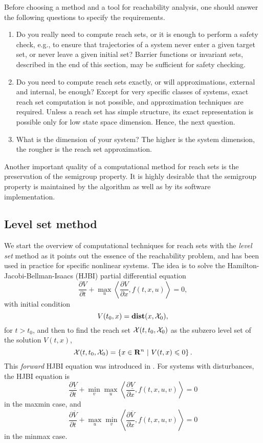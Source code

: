 Before choosing a method and a tool for reachability analysis, one should answer the following questions to specify the requirements.
\begin{enumerate}
\item Do you really need to compute reach sets, or it is enough to perform
a safety check, e.g., to ensure that trajectories of a system
never enter a given target set, or never leave a given initial set?
Barrier functions or invariant sets, described in the end of this
section, may be sufficient for safety checking.

\item Do you need to compute reach sets exactly, or will approximations, external
and internal, be enough?
Except for very specific classes of systems, exact reach set computation
is not possible, and approximation techniques are required.
Unless a reach set has simple structure, its exact representation is
possible only for low state space dimension.
Hence, the next question.

\item What is the dimension of your system?
The higher is the system dimension, the rougher is the reach set approximation.
\end{enumerate}
Another important quality of a computational method for reach sets is
the preservation of the semigroup property.
It is highly desirable that the semigroup property is maintained by the
algorithm as well as by its software implementation.











\subsection{Level set method}\label{subsec_levelset}
We start the overview of computational techniques for reach sets with the
\emph{level set} method as it points out the essence of the
reachability problem, and 
has been used in practice for specific nonlinear systems.
The idea is to solve the Hamilton-Jacobi-Bellman-Isaacs (HJBI) partial
differential equation
\[ \frac{\partial V}{\partial t} +
\max_u\left\langle\frac{\partial V}{\partial x}, f(t, x, u)\right\rangle = 0,\]
with initial condition
\[ V(t_0, x) = {\bf dist}(x, \XX_0), \]
for $t>t_0$, and then to find the reach set $\XX(t, t_0, \XX_0)$ as the subzero level
set of the solution $V(t, x)$,
\[ \XX(t, t_0, \XX_0) = \left\{x\in{\bf R}^n ~|~ V(t, x) \leq 0\right\} .\]
This \emph{forward} HJBI equation was introduced in \cite{leitmann82}.
For systems with disturbances, the HJBI equation is
\[ \frac{\partial \underline{V}}{\partial t} +
\min_v\max_u\left\langle\frac{\partial \underline{V}}{\partial x},
f(t, x, u, v)\right\rangle = 0 \]
in the maxmin case, and
\[ \frac{\partial \overline{V}}{\partial t} +
\max_u\min_v\left\langle\frac{\partial \overline{V}}{\partial x},
f(t, x, u, v)\right\rangle = 0 \]
in the minmax case.

